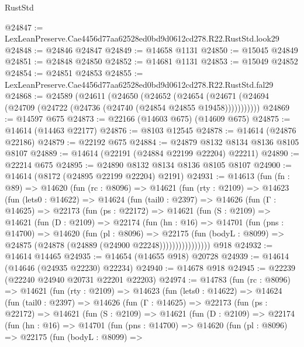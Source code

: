\begin{lexlean}{RustStd}
\begin{coremodule}
@24847 := LexLeanPreserve.Cae4456d77aa62528ed0bd9d0612cd278.R22.RustStd.look29
@24848 := @24846 @24847
@24849 := @14658 @1131
@24850 := @15045 @24849
@24851 := @24848 @24850
@24852 := @14681 @1131
@24853 := @15049 @24852
@24854 := @24851 @24853
@24855 := LexLeanPreserve.Cae4456d77aa62528ed0bd9d0612cd278.R22.RustStd.fal29
@24868 := @24589
    (@24611
      (@24650
        (@24652
          (@24654 (@24671 (@24694 (@24709 (@24722 (@24736 (@24740 (@24854 @24855 @19458)))))))))))
@24869 := @14597 @675
@24873 := @22166 (@14603 @675) (@14609 @675)
@24875 := @14614 (@14463 @22177)
@24876 := @8103 @12545
@24878 := @14614 (@24876 @22186)
@24879 := @22192 @675
@24884 := @24879 @8132 @8134 @8136 @8105 @8107
@24889 := @14614 (@22191 (@24884 @22199 @22204) @22211)
@24890 := @22214 @675
@24895 := @24890 @8132 @8134 @8136 @8105 @8107
@24900 := @14614 (@8172 (@24895 @22199 @22204) @2191)
@24931 := @14613
    (fun (fn : @89) =>
    @14620
      (fun (rc : @8096) =>
      @14621
        (fun (rty : @2109) =>
        @14623
          (fun (lets0 : @14622) =>
          @14624
            (fun (tail0 : @2397) =>
            @14626
              (fun (Γ : @14625) =>
              @22173
                (fun (ps : @22172) =>
                @14621
                  (fun (S : @2109) =>
                  @14621
                    (fun (D : @2109) =>
                    @22174
                      (fun (hn : @16) =>
                      @14701
                        (fun (pns : @14700) =>
                        @14620
                          (fun (pl : @8096) =>
                          @22175
                            (fun (bodyL : @8099) =>
                            @24875 (@24878 (@24889 (@24900 @22248))))))))))))))))
    @918
@24932 := @14614 @14465
@24935 := @14654 (@14655 @918) @20728
@24939 := @14614 (@14646 (@24935 @22230) @22234)
@24940 := @14678 @918
@24945 := @22239 (@22240 @24940 @20731 @22201 @22203)
@24974 := @14783
    (fun (rc : @8096) =>
    @14621
      (fun (rty : @2109) =>
      @14623
        (fun (lets0 : @14622) =>
        @14624
          (fun (tail0 : @2397) =>
          @14626
            (fun (Γ : @14625) =>
            @22173
              (fun (ps : @22172) =>
              @14621
                (fun (S : @2109) =>
                @14621
                  (fun (D : @2109) =>
                  @22174
                    (fun (hn : @16) =>
                    @14701
                      (fun (pns : @14700) =>
                      @14620
                        (fun (pl : @8096) =>
                        @22175
                          (fun (bodyL : @8099) =>

\end{coremodule}
\end{lexlean}
